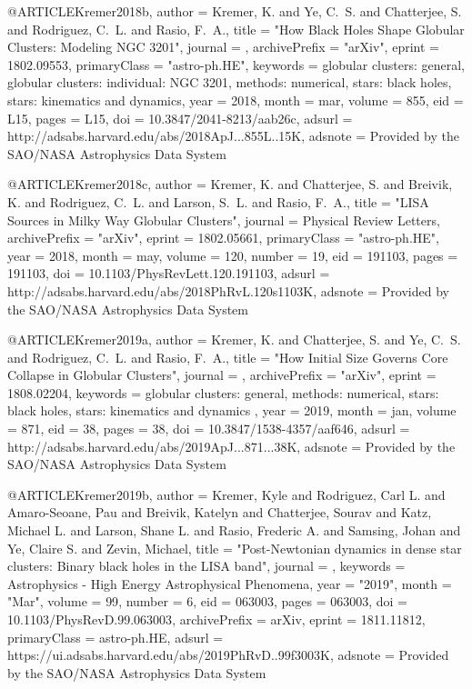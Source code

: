 \documentclass[twocolumn,tighten]{aastex63}
\begin{document}
{{{{{@ARTICLE{Kremer2018b,
   author = {{Kremer}, K. and {Ye}, C.~S. and {Chatterjee}, S. and {Rodriguez}, C.~L. and 
	{Rasio}, F.~A.},
    title = "{How Black Holes Shape Globular Clusters: Modeling NGC 3201}",
  journal = {\apjl},
archivePrefix = "arXiv",
   eprint = {1802.09553},
 primaryClass = "astro-ph.HE",
 keywords = {globular clusters: general, globular clusters: individual: NGC 3201, methods: numerical, stars: black holes, stars: kinematics and dynamics},
     year = 2018,
    month = mar,
   volume = 855,
      eid = {L15},
    pages = {L15},
      doi = {10.3847/2041-8213/aab26c},
   adsurl = {http://adsabs.harvard.edu/abs/2018ApJ...855L..15K},
  adsnote = {Provided by the SAO/NASA Astrophysics Data System}
}

@ARTICLE{Kremer2018c,
   author = {{Kremer}, K. and {Chatterjee}, S. and {Breivik}, K. and {Rodriguez}, C.~L. and 
	{Larson}, S.~L. and {Rasio}, F.~A.},
    title = "{LISA Sources in Milky Way Globular Clusters}",
  journal = {Physical Review Letters},
archivePrefix = "arXiv",
   eprint = {1802.05661},
 primaryClass = "astro-ph.HE",
     year = 2018,
    month = may,
   volume = 120,
   number = 19,
      eid = {191103},
    pages = {191103},
      doi = {10.1103/PhysRevLett.120.191103},
   adsurl = {http://adsabs.harvard.edu/abs/2018PhRvL.120s1103K},
  adsnote = {Provided by the SAO/NASA Astrophysics Data System}
}

@ARTICLE{Kremer2019a,
   author = {{Kremer}, K. and {Chatterjee}, S. and {Ye}, C.~S. and {Rodriguez}, C.~L. and 
	{Rasio}, F.~A.},
    title = "{How Initial Size Governs Core Collapse in Globular Clusters}",
  journal = {\apj},
archivePrefix = "arXiv",
   eprint = {1808.02204},
 keywords = {globular clusters: general, methods: numerical, stars: black holes, stars: kinematics and dynamics },
     year = 2019,
    month = jan,
   volume = 871,
      eid = {38},
    pages = {38},
      doi = {10.3847/1538-4357/aaf646},
   adsurl = {http://adsabs.harvard.edu/abs/2019ApJ...871...38K},
  adsnote = {Provided by the SAO/NASA Astrophysics Data System}
}

@ARTICLE{Kremer2019b,
       author = {{Kremer}, Kyle and {Rodriguez}, Carl L. and {Amaro-Seoane}, Pau and
         {Breivik}, Katelyn and {Chatterjee}, Sourav and {Katz}, Michael L. and
         {Larson}, Shane L. and {Rasio}, Frederic A. and {Samsing}, Johan and
         {Ye}, Claire S. and {Zevin}, Michael},
        title = "{Post-Newtonian dynamics in dense star clusters: Binary black holes in the LISA band}",
      journal = {\prd},
     keywords = {Astrophysics - High Energy Astrophysical Phenomena},
         year = "2019",
        month = "Mar",
       volume = {99},
       number = {6},
          eid = {063003},
        pages = {063003},
          doi = {10.1103/PhysRevD.99.063003},
archivePrefix = {arXiv},
       eprint = {1811.11812},
 primaryClass = {astro-ph.HE},
       adsurl = {https://ui.adsabs.harvard.edu/abs/2019PhRvD..99f3003K},
      adsnote = {Provided by the SAO/NASA Astrophysics Data System}
}

}}}}}
\end{document}
